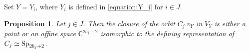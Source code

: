 \documentclass{amsart}
\newtheorem{proposition}[theorem]{Proposition}
\theoremstyle{definition}
\newcommand{\C}{\mathbb{C}}
\newcommand{\m}{\mathrm{m}}
\newcommand{\0}{\mathcal{O}}
\begin{document}
Set $Y= Y_i$, where $Y_i$ is defined in \eqref{equation:Y_i} for $i \in J$.

\begin{proposition}\label{prop:affine_orbits_Cj}
Let $j \in J$.  
Then the closure of the orbit $C_j.v_{Y}$ in $V_{Y}$ is either a point or
an affine space $\C^{2b_j+2}$ isomorphic to the defining representation of $C_j \simeq {\rm Sp}_{2b_j+2}$.  %
\end{proposition}


    
\end{document}
